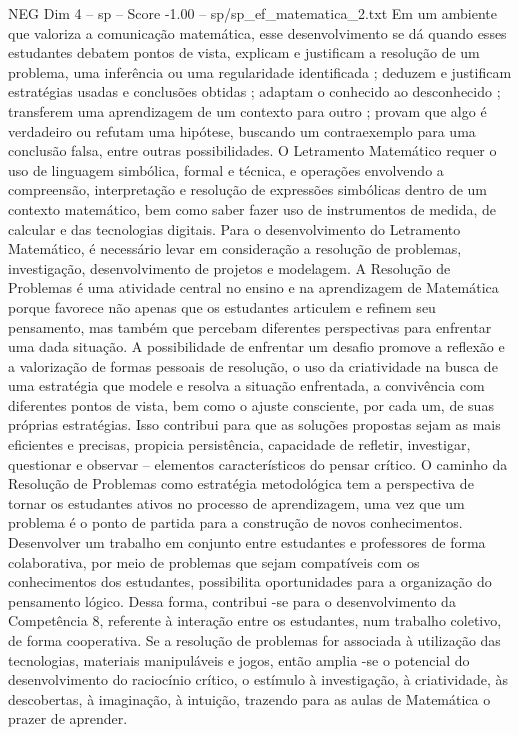 \begin{textsample}{NEG Dim 4 – sp – Score -1.00 – sp/sp\_ef\_matematica\_2.txt}
Em um ambiente que valoriza a comunicação matemática, esse desenvolvimento se dá quando esses estudantes debatem pontos de vista, explicam e justificam a resolução de um problema, uma inferência ou uma regularidade identificada ; deduzem e justificam estratégias usadas e conclusões obtidas ; adaptam o conhecido ao desconhecido ; transferem uma aprendizagem de um contexto para outro ; provam que algo é verdadeiro ou refutam uma hipótese, buscando um contraexemplo para uma conclusão falsa, entre outras possibilidades.
O Letramento Matemático requer o uso de linguagem simbólica, formal e técnica, e operações envolvendo a compreensão, interpretação e resolução de expressões simbólicas dentro de um contexto matemático, bem como saber fazer uso de instrumentos de medida, de calcular e das tecnologias digitais.
Para o desenvolvimento do Letramento Matemático, é necessário levar em consideração a resolução de problemas, investigação, desenvolvimento de projetos e modelagem.
A Resolução de Problemas é uma atividade central no ensino e na aprendizagem de Matemática porque favorece não apenas que os estudantes articulem e refinem seu pensamento, mas também que percebam diferentes perspectivas para enfrentar uma dada situação.
A possibilidade de enfrentar um desafio promove a reflexão e a valorização de formas pessoais de resolução, o uso da criatividade na busca de uma estratégia que modele e resolva a situação enfrentada, a convivência com diferentes pontos de vista, bem como o ajuste consciente, por cada um, de suas próprias estratégias.
Isso contribui para que as soluções propostas sejam as mais eficientes e precisas, propicia persistência, capacidade de refletir, investigar, questionar e observar – elementos característicos do pensar crítico.
O caminho da Resolução de Problemas como estratégia metodológica tem a perspectiva de tornar os estudantes ativos no processo de aprendizagem, uma vez que um problema é o ponto de partida para a construção de novos conhecimentos.
Desenvolver um trabalho em conjunto entre estudantes e professores de forma colaborativa, por meio de problemas que sejam compatíveis com os conhecimentos dos estudantes, possibilita oportunidades para a organização do pensamento lógico.
Dessa forma, contribui -se para o desenvolvimento da Competência 8, referente à interação entre os estudantes, num trabalho coletivo, de forma cooperativa.
Se a resolução de problemas for associada à utilização das tecnologias, materiais manipuláveis e jogos, então amplia -se o potencial do desenvolvimento do raciocínio crítico, o estímulo à investigação, à criatividade, às descobertas, à imaginação, à intuição, trazendo para as aulas de Matemática o prazer de aprender.

\end{textsample}
